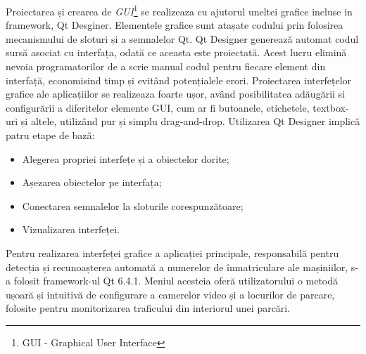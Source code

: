 \documentclass[12pt]{article}
\begin{document}
Proiectarea și crearea de \emph{GUI}\footnote{GUI - Graphical User Interface} se realizeaza cu ajutorul uneltei grafice incluse in framework, Qt Desginer. Elementele grafice sunt atașate codului prin folosirea mecanismului de sloturi și a semnalelor Qt. Qt Designer genereaz\u{a} automat codul surs\u{a} asociat cu interfața, odat\u{a} ce aceasta este proiectat\u{a}. Acest lucru elimin\u{a} nevoia programatorilor de a scrie manual codul pentru fiecare element din interfaț\u{a}, economisind timp și evit\^{a}nd potențialele erori. Proiectarea interfețelor grafice ale aplicațiilor se realizeaza foarte ușor, av\^{a}nd posibilitatea ad\u{a}ug\u{a}rii si configur\u{a}rii a diferitelor elemente GUI, cum ar fi butoanele, etichetele, textbox-uri și altele, utiliz\^{a}nd pur și simplu drag-and-drop. Utilizarea Qt Designer implic\u{a} patru etape de baz\u{a}:
\begin{itemize}
    \item Alegerea propriei interfețe și a obiectelor dorite;
    \item Așezarea obiectelor pe interfața;
    \item Conectarea semnalelor la sloturile corespunz\u{a}toare;
    \item Vizualizarea interfeței.
\end{itemize}

Pentru realizarea interfeței grafice a aplicației principale, responsabil\u{a} pentru detecția și recunoașterea automat\u{a} a numerelor de \^{i}nmatriculare ale mașiniilor, s-a folosit framework-ul Qt 6.4.1. Meniul acesteia ofer\u{a} utilizatorului o metod\u{a} ușoar\u{a} și intuitiv\u{a} de configurare a camerelor video și a locurilor de parcare, folosite pentru monitorizarea traficului din interiorul unei parc\u{a}ri.
\end{document}
